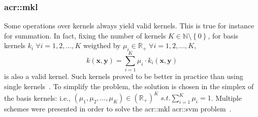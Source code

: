         \subsubsection{\acrlong*{acr::mkl}}
            Some operations over kernels always yield valid kernels.
            This is true for instance for summation.
            In fact, fixing the number of kernels $K\in \mathbb{N} \setminus \left\{0\right\}$, for basis kernels $k_i \; \forall i = 1, 2, \dots, K$ weigthed by $\mu_i \in \mathbb{R}_+\; \forall i = 1, 2, \dots, K$,
            \begin{equation}
                \label{eq::mkl}
                k(\bm{x}, \bm{y}) = \sum_{i=1}^K \mu_i \cdot k_i(\bm{x}, \bm{y})
            \end{equation}
            is also a valid kernel.
            Such kernels proved to be better in practice than using single kernels~\parencite{lanckriet2004statistical}.
            To simplify the problem, the solution is chosen in the simplex of the basis kernels: i.e., $ (\mu_1, \mu_2, \dots, \mu_K) \in (\mathbb{R}_+)^K  \; s.t. \sum_{i=1}^K \mu_i = 1$.
            Multiple schemes were presented in order to solve the \gls{acr::mkl} \gls{acr::svm} problem~\parencite{rakotomamonjy2008simplemkl,varma2009more,sun2010multiple}.
            
